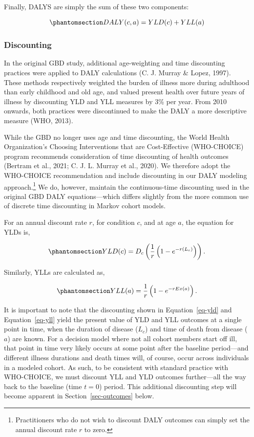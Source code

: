 \documentclass[
]{agujournal2019}
\begin{document}
Finally, DALYS are simply the sum of these two components:

\begin{equation}\phantomsection\label{eq-daly}{
DALY(c,a) = YLD(c) + YLL(a)
}\end{equation}

\subsubsection{Discounting}\label{discounting}

In the original GBD study, additional age-weighting and time discounting
practices were applied to DALY calculations (C. J. Murray \& Lopez,
1997). These methods respectively weighted the burden of illness more
during adulthood than early childhood and old age, and valued present
health over future years of illness by discounting YLD and YLL measures
by 3\% per year. From 2010 onwards, both practices were discontinued to
make the DALY a more descriptive measure (WHO, 2013).

While the GBD no longer uses age and time discounting, the World Health
Organization's Choosing Interventions that are Cost-Effective
(WHO-CHOICE) program recommends consideration of time discounting of
health outcomes (Bertram et al., 2021; C. J. L. Murray et al., 2020). We
therefore adopt the WHO-CHOICE recommendation and include discounting in
our DALY modeling approach.\footnote{Practitioners who do not wish to
  discount DALY outcomes can simply set the annual discount rate \(r\)
  to zero.} We do, however, maintain the continuous-time discounting
used in the original GBD DALY equations---which differs slightly from
the more common use of discrete time discounting in Markov cohort
models.

For an annual discount rate \(r\), for condition \(c\), and at age
\(a\), the equation for YLDs is,

\begin{equation}\phantomsection\label{eq-yld}{
YLD(c) = D_c  \left ( \frac{1}{r}\left(1-e^{-r(L_c) }\right) \right ).
}\end{equation}

Similarly, YLLs are calculated as,

\begin{equation}\phantomsection\label{eq-yll}{
YLL(a)= \frac{1}{r}\left(1-e^{-r Ex(a)}\right).
}\end{equation}

It is important to note that the discounting shown in
Equation~\ref{eq-yld} and Equation~\ref{eq-yll} yield the present value
of YLD and YLL outcomes at a single point in time, when the duration of
disease (\(L_c\)) and time of death from disease (\(a\)) are known. For
a decision model where not all cohort members start off ill, that point
in time very likely occurs at some point after the baseline period---and
different illness durations and death times will, of course, occur
across individuals in a modeled cohort. As such, to be consistent with
standard practice with WHO-CHOICE, we must discount YLL and YLD outcomes
further---all the way back to the baseline (time \(t=0\)) period. This
additional discounting step will become apparent in
Section~\ref{sec-outcomes} below.
\end{document}
